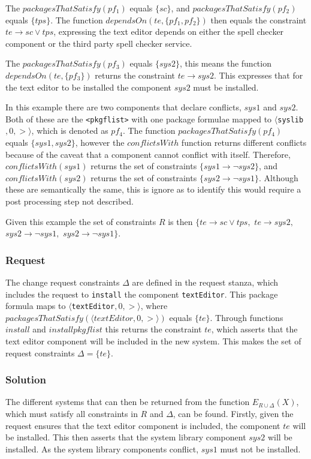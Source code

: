 The $packagesThatSatisfy(pf_1)$ equals $\{sc\}$, and $packagesThatSatisfy(pf_2)$ equals $\{tps\}$.
The function $dependsOn(te , \{pf_1,pf_2\} )$ 
then equals the constraint $te \rightarrow sc \vee tps$,
expressing the text editor depends on either the spell checker component or the third party spell checker service.

The $packagesThatSatisfy(pf_3)$ equals $\{sys2\}$,
this means the function  $dependsOn(te , \{pf_3\} )$ returns the constraint  $te \rightarrow sys2$.
This expresses that for the text editor to be installed the component $sys2$ must be installed.

In this example there are two components that declare conflicts, $sys1$ and $sys2$.
Both of these are the \verb+<pkgflist>+ with one package formulae mapped to  $\langle $\verb+syslib+$,0,>\rangle$, which is denoted as $pf_4$.
The function $packagesThatSatisfy(pf_4)$ equals $\{ sys1,sys2 \}$,
however the $conflictsWith$ function returns different conflicts because of the caveat that a component cannot conflict with itself.
Therefore, $conflictsWith(sys1)$ returns the set of constraints $\{sys1 \rightarrow \neg sys2\}$,
and $conflictsWith(sys2)$ returns the set of constraints $\{sys2 \rightarrow \neg sys1\}$.
Although these are semantically the same, this is ignore as to identify this would require a post processing step not described.

Given this example the set of constraints $R$ is then 
$\{ te \rightarrow sc \vee tps,$ 
$te \rightarrow sys2,$ 
$sys2 \rightarrow \neg sys1,$   
$sys2 \rightarrow \neg sys1\}$.

\subsubsection{Request}
The change request constraints $\Delta$ are defined in the request stanza, which includes the request to \verb+install+ the component \verb+textEditor+. 
This package formula maps to $\langle $\verb+textEditor+$,0,>\rangle$, where $packagesThatSatisfy(\langle textEditor,0,>\rangle)$ equals $\{te\}$.
Through functions $install$ and $installpkgflist$ this returns the constraint $te$,
which asserts that the text editor component will be included in the new system.
This makes the set of request constraints $\Delta = \{te\}$.

\subsubsection{Solution}
The different systems that can then be returned from the function $E_{R \cup \Delta}(X)$, which must satisfy all constraints in $R$ and $\Delta$, can be found.
Firstly, given the request ensures that the text editor component is included, the component $te$ will be installed.
This then asserts that the system library component $sys2$ will be installed.
As the system library components conflict, $sys1$ must not be installed.

